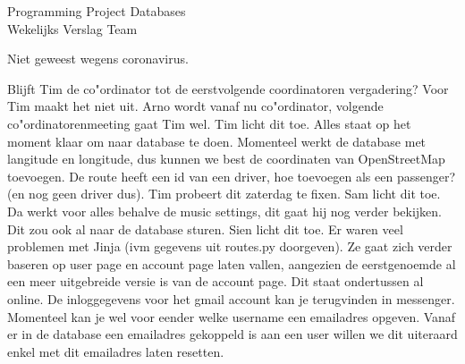 \documentclass{article}
\newcounter{team}
\begin{document}

	\begin{Minutes}{Programming Project Databases \\ Wekelijks Verslag Team }
		\missingNoExcuse{/}
		\missingExcused{/}

		\maketitle

		Niet geweest wegens coronavirus.





				    Blijft Tim de co"ordinator tot de eerstvolgende coordinatoren vergadering? Voor Tim maakt het niet uit. Arno wordt vanaf nu co"ordinator, volgende co"ordinatorenmeeting gaat Tim wel.
				    Tim licht dit toe. Alles staat op het moment klaar om naar database te doen. Momenteel werkt de database met langitude en longitude, dus kunnen we best de coordinaten van OpenStreetMap toevoegen. De route heeft een id van een driver, hoe toevoegen als een passenger? (en nog geen driver dus). Tim probeert dit zaterdag te fixen.
			        Sam licht dit toe. Da werkt voor alles behalve de music settings, dit gaat hij nog verder bekijken. Dit zou ook al naar de database sturen.
			        Sien licht dit toe. Er waren veel problemen met Jinja (ivm gegevens uit routes.py doorgeven). Ze gaat zich verder baseren op user page en account page laten vallen, aangezien de eerstgenoemde al een meer uitgebreide versie is van de account page.
			        Dit staat ondertussen al online. De inloggegevens voor het gmail account kan je terugvinden in messenger. Momenteel kan je wel voor eender welke username een emailadres opgeven. Vanaf er in de database een emailadres gekoppeld is aan een user willen we dit uiteraard enkel met dit emailadres laten resetten.


\end{Minutes}
\end{document}
